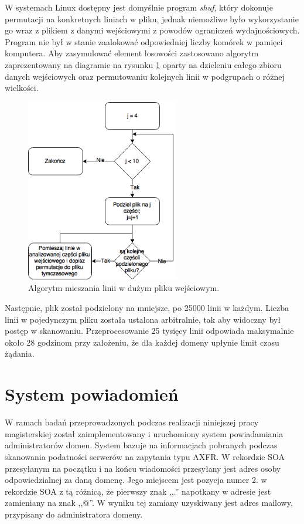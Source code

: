 W systemach Linux dostępny jest domyślnie program \textit{shuf}\cite{shuf}, który dokonuje permutacji na konkretnych liniach w pliku,
jednak niemożliwe było wykorzystanie go wraz z plikiem z danymi wejściowymi z powodów ograniczeń wydajnościowych. Program nie był w
stanie zaalokować odpowiedniej liczby komórek w pamięci komputera. Aby zasymulować element losowości zastosowano algorytm zaprezentowany
na diagramie na rysunku \ref{fig:shufAlgorithm} oparty na dzieleniu całego zbioru danych wejściowych oraz permutowaniu kolejnych linii
w podgrupach o różnej wielkości.

\begin{figure}[ht]
	\centering
	\includegraphics[width=0.6\textwidth]{image/sfuh}
	\caption{Algorytm mieszania linii w dużym pliku wejściowym.}
	\label{fig:shufAlgorithm}
\end{figure}

Następnie, plik został podzielony na mniejsze, po 25000 linii w każdym. Liczba linii w pojedynczym pliku została ustalona arbitralnie,
tak aby widoczny był postęp w skanowaniu. Przeprocesowanie 25 tysięcy linii odpowiada maksymalnie około 28 godzinom przy założeniu,
że dla każdej domeny upłynie limit czasu żądania.

\section{System powiadomień}
W ramach badań przeprowadzonych podczas realizacji niniejszej pracy magisterskiej został zaimplementowany i uruchomiony system
powiadamiania administratorów domen. System bazuje na informacjach pobranych podczas skanowania podatności serwerów na zapytania
typu AXFR. W rekordzie SOA przesyłanym na początku i na końcu wiadomości przesyłany jest adres osoby odpowiedzialnej za daną domenę.
Jego miejscem jest pozycja numer 2. w rekordzie SOA z tą różnicą, że pierwszy znak ,,.'' napotkany w adresie jest zamieniany na
znak ,,@''. W wyniku tej zamiany uzyskiwany jest adres mailowy, przypisany do administratora domeny.

